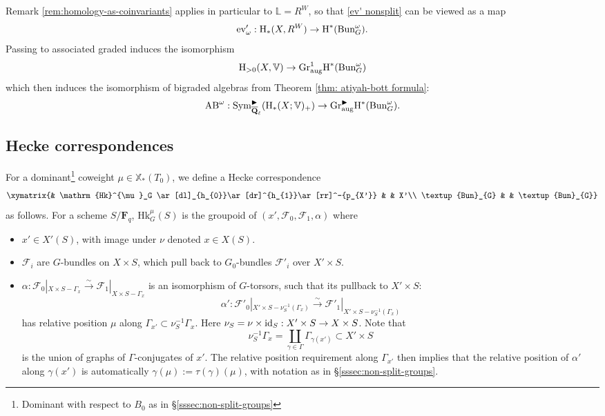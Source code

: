 \documentclass[reqno]{amsart}
\numberwithin{equation}{subsection}
\theoremstyle{definition}
\def\LL{\mathbb{L}}
\def\VV{\mathbb{V}}
\newcommand\cF{\mathcal{F}}
\newcommand{\Bun}{\textup{Bun}}
\newcommand\ev{\textup{ev}}
\newcommand{\Gr}{\textup{Gr}}
\newcommand\Hk{\mathrm{Hk}}
\newcommand\id{\textup{id}}
\newcommand\Sym{\textup{Sym}}
\newcommand\xcoch{\mathbb{X}_*}
\newcommand{\Qlbar}{\overline{\Q}_\ell}
\newcommand{\homog}[2]{\textup{H}_{#1}({#2})}  %
\newcommand{\cohog}[2]{\textup{H}^{#1}({#2})}     %
\newcommand{\isom}{\stackrel{\sim}{\to}}
\renewcommand\a\alpha
\newcommand\g\gamma
\newcommand\G\Gamma
\renewcommand{\t}{\tau}
\newcommand{\om}{\omega}
\newcommand\aug{\textup{aug}}
\newcommand\AB{\textup{AB}}
\newcommand\bl{\blacktriangleright}
\newcommand{\F}{\mathbf{F}}
\newcommand{\Q}{\mathbf{Q}}
\newcommand{\rH}{\ensuremath{\mathrm{H}}\xspace}
\begin{document}
Remark \ref{rem:homology-as-coinvariants} applies in particular to $\LL = R^W$, so that \eqref{ev' nonsplit} can be viewed as a map
\begin{equation*}
\ev'_{\om}: \homog{*}{X,R^{W}}\to \cohog{*}{\Bun_{G}^{\om}}.
\end{equation*}
Passing to associated graded induces the isomorphism 
\begin{equation*}
\homog{>0}{X,\VV}\to \Gr^{1}_{\aug}\cohog{*}{\Bun_{G}^{\om}}
\end{equation*}
which then induces the isomorphism of bigraded algebras from Theorem \ref{thm: atiyah-bott formula}:
\begin{equation}\label{eq:AB-nonsplit}
\AB^{\om}: 
\Sym_{\Qlbar}^{\bl} (\rH_*(X; \VV)_+) \rightarrow \Gr^{\bl}_{\aug} \rH^*(\Bun_G^\omega).
\end{equation}




\subsection{Hecke correspondences}\label{sss:Hk qs}
For a dominant\footnote{Dominant with respect to $B_0$ as in \S \ref{sssec:non-split-groups}} coweight $\mu \in \xcoch(T_{0})$, we define a Hecke correspondence 
\begin{equation*}
\xymatrix{& \Hk^{\mu}_G \ar[dl]_{h_{0}}\ar[dr]^{h_{1}}\ar[rr]^-{p_{X'}} & & X'\\
\Bun_{G} & & \Bun_{G}}
\end{equation*}
as follows. For a scheme $S/\F_q$, $\Hk^{\mu}_G(S)$ is the groupoid of $(x',\cF_{0},\cF_{1}, \a)$ where 
\begin{itemize}
    \item $x'\in X'(S)$, with image under $\nu$ denoted $x\in X(S)$.
    \item $\cF_{i}$ are $G$-bundles on $X\times S$, which pull back to $G_{0}$-bundles $\cF'_{i}$ over $X'\times S$. 
    \item $\a: \cF_{0}|_{X\times S-\G_{x}}\isom \cF_{1}|_{X\times S-\G_{x}}$ is an isomorphism of $G$-torsors, such that its pullback to $X'\times S$:
\begin{equation*}
\a': \cF'_{0}|_{X'\times S-\nu_{S}^{-1}(\G_{x})}\isom \cF'_{1}|_{X'\times S-\nu_{S}^{-1}(\G_{x})}
\end{equation*}
has relative position $\mu$ along $\G_{x'}\subset\nu_{S}^{-1}\G_{x}$. Here $\nu_{S}=\nu\times\id_{S}:X'\times S\to X\times S$. Note that
\begin{equation*}
\nu_{S}^{-1}\G_{x}=\coprod_{\g\in\G}\G_{\g(x')}\subset X'\times S
\end{equation*}
is the union of graphs of $\G$-conjugates of $x'$. The relative position requirement along $\G_{x'}$ then implies that the relative position of $\a'$ along $\g(x')$ is automatically $\g(\mu):=\t(\g)(\mu)$, with notation as in \S \ref{sssec:non-split-groups}.  
\end{itemize} 
\end{document}
